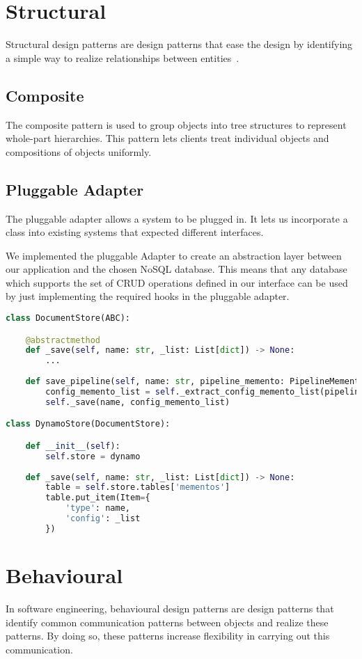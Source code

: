 \section{Structural}
Structural design patterns are design patterns that ease the design by identifying a simple way to
realize relationships between entities~\citep{oodesign}.


\subsection{Composite}
The composite pattern is used to group objects into tree structures to represent whole-part hierarchies. This pattern lets clients treat individual objects and compositions of objects uniformly. \cite{sourcemaking}

\subsection{Pluggable Adapter}
The pluggable adapter allows a system to be plugged in. It lets us incorporate a class into
existing systems that expected different interfaces.

We implemented the pluggable Adapter to create an abstraction layer between our application and
the chosen NoSQL database. This means that any database which supports the set of CRUD operations
defined in our interface can be used by just implementing the required hooks in the pluggable
adapter.

\begin{lstlisting}[language=Python]
class DocumentStore(ABC):

	@abstractmethod
	def _save(self, name: str, _list: List[dict]) -> None:
		...
	
	def save_pipeline(self, name: str, pipeline_memento: PipelineMemento) -> None:
		config_memento_list = self._extract_config_memento_list(pipeline_memento)
		self._save(name, config_memento_list)

class DynamoStore(DocumentStore):

	def __init__(self):
		self.store = dynamo
	
	def _save(self, name: str, _list: List[dict]) -> None:
		table = self.store.tables['mementos']
		table.put_item(Item={
			'type': name,
			'config': _list
		})
\end{lstlisting}

\section{Behavioural}
In software engineering, behavioural design patterns are design patterns that identify common communication patterns between objects and realize these patterns. By doing so, these patterns increase flexibility in carrying out this communication. \cite{sourcemaking}

